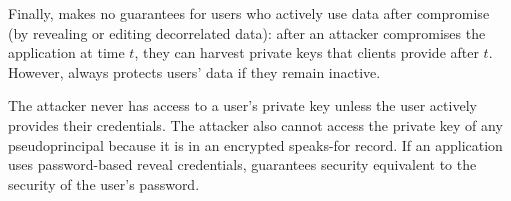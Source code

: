 Finally, \sys makes no guarantees for users who actively use \xxed data after
compromise (\eg by revealing or editing decorrelated data): after an attacker
compromises the application at time $t$, they can harvest private keys that
clients provide after $t$.
%
However, \sys always protects users' \xxed data if they remain inactive.
%
%
%
%

%
%

%

%



%
%
The attacker never has access to a user's private key unless the user actively
provides their credentials.
%
The attacker also cannot access the private key of any pseudoprincipal because
it is in an encrypted speaks-for record.
%
%
If an application uses password-based reveal credentials, \sys
guarantees security equivalent to the security of the user's password.
